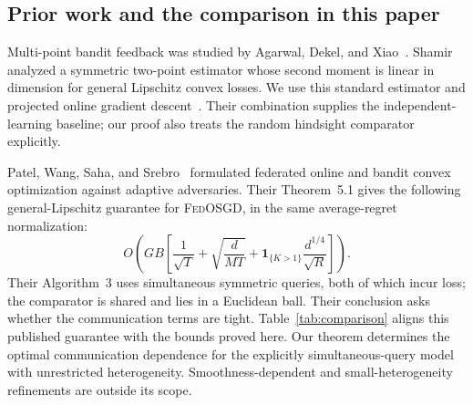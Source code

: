 \documentclass[11pt,a4paper]{article}
\numberwithin{equation}{section}
\theoremstyle{remark}
\newcommand{\ind}{\mathbf 1}
\begin{document}
\subsection{Prior work and the comparison in this paper}

Multi-point bandit feedback was studied by Agarwal, Dekel, and
Xiao~\cite{ADX10}. Shamir~\cite{Shamir17} analyzed a symmetric two-point
estimator whose second moment is linear in dimension for general
Lipschitz convex losses. We use this standard estimator and projected
online gradient descent~\cite{Zinkevich03}. Their combination supplies
the independent-learning baseline; our proof also treats the random
hindsight comparator explicitly.

Patel, Wang, Saha, and Srebro~\cite{PWSS23} formulated federated online
and bandit convex optimization against adaptive adversaries. Their
Theorem~5.1 gives the following general-Lipschitz guarantee for
\textsc{FedOSGD}, in the same average-regret normalization:
\begin{equation}
 O\!\left(GB\left[\frac1{\sqrt T}+\sqrt{\frac d{MT}}
       +\ind_{\{K>1\}}\frac{d^{1/4}}{\sqrt R}\right]\right).
 \label{eq:prior}
\end{equation}
Their Algorithm~3 uses simultaneous symmetric queries, both of which
incur loss; the comparator is shared and lies in a Euclidean ball.
Their conclusion asks whether the communication terms are tight.
Table~\ref{tab:comparison} aligns this published guarantee with the
bounds proved here. Our theorem determines the optimal communication
dependence for the explicitly simultaneous-query model with unrestricted
heterogeneity. Smoothness-dependent and small-heterogeneity refinements
are outside its scope.
\end{document}
